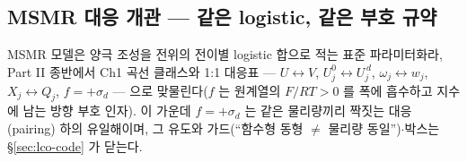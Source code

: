 \subsection{MSMR 대응 개관 --- 같은 logistic, 같은 부호 규약}\label{sec:lco-preview}
MSMR 모델\cite{msmr_origin2017,msmr2024}은 양극 조성을 전위의 전이별 logistic 합으로 적는 표준
파라미터화라, Part II 종반에서 Ch1 곡선 클래스와 1:1 대응표 --- $U\leftrightarrow V$,
$U_j^0\leftrightarrow U_j^{\,d}$, $\omega_j\leftrightarrow w_j$, $X_j\leftrightarrow Q_j$, $f=+\sigma_d$ ---
으로 맞물린다($f$ 는 원계열의 $F/RT>0$ 를 폭에 흡수하고 지수에 남는 방향 부호 인자). 이 가운데
$f=+\sigma_d$ 는 같은 물리량끼리 짝짓는 대응(pairing) 하의 유일해이며, 그 유도와 가드(``함수형 동형 $\ne$ 물리량
동일'')$\cdot$박스는 \S\ref{sec:lco-code} 가 닫는다.

